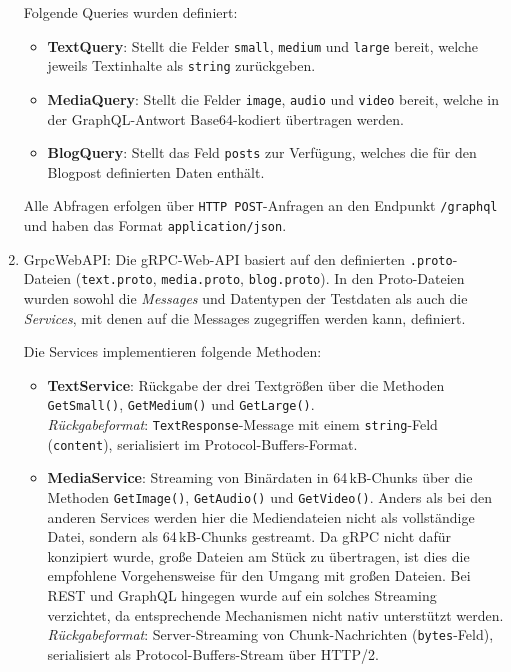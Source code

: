 \begin{enumerate}
	Folgende Queries wurden definiert:
	\begin{itemize}
		\item \textbf{TextQuery}: Stellt die Felder \texttt{small}, \texttt{medium} und \texttt{large} bereit, welche jeweils Textinhalte als \texttt{string} zurückgeben.
		\item \textbf{MediaQuery}: Stellt die Felder \texttt{image}, \texttt{audio} und \texttt{video} bereit, welche in der GraphQL-Antwort Base64-kodiert übertragen werden.
		\item \textbf{BlogQuery}: Stellt das Feld \texttt{posts} zur Verfügung, welches die für den Blogpost definierten Daten enthält.
	\end{itemize}
	
	Alle Abfragen erfolgen über \texttt{HTTP~POST}-Anfragen an den Endpunkt \texttt{/graphql} und haben das Format \texttt{application/json}.
	
	\item GrpcWebAPI: 
	Die gRPC-Web-API basiert auf den definierten \texttt{.proto}-Dateien (\texttt{text.proto}, \texttt{media.proto}, \texttt{blog.proto}). In den Proto-Dateien wurden sowohl die \emph{Messages} und Datentypen der Testdaten als auch die \emph{Services}, mit denen auf die Messages zugegriffen werden kann, definiert. 
	
	Die Services implementieren folgende Methoden:
	\begin{itemize}
		\item \textbf{TextService}: Rückgabe der drei Textgrößen über die Methoden \texttt{GetSmall()}, \texttt{GetMedium()} und \texttt{GetLarge()}.\\
		\emph{Rückgabeformat}: \texttt{TextResponse}-Message mit einem \texttt{string}-Feld (\texttt{content}), serialisiert im Protocol-Buffers-Format.
		
		\item \textbf{MediaService}: Streaming von Binärdaten in 64\,kB-Chunks über die Methoden \texttt{GetImage()}, \texttt{GetAudio()} und \texttt{GetVideo()}. Anders als bei den anderen Services werden hier die Mediendateien nicht als vollständige Datei, sondern als 64\,kB-Chunks gestreamt. Da gRPC nicht dafür konzipiert wurde, große Dateien am Stück zu übertragen, ist dies die empfohlene Vorgehensweise für den Umgang mit großen Dateien. Bei REST und GraphQL hingegen wurde auf ein solches Streaming verzichtet, da entsprechende Mechanismen nicht nativ unterstützt werden.\\
		\emph{Rückgabeformat}: Server-Streaming von Chunk-Nachrichten (\texttt{bytes}-Feld), serialisiert als Protocol-Buffers-Stream über HTTP/2.
		

\end{itemize}
\end{enumerate}

